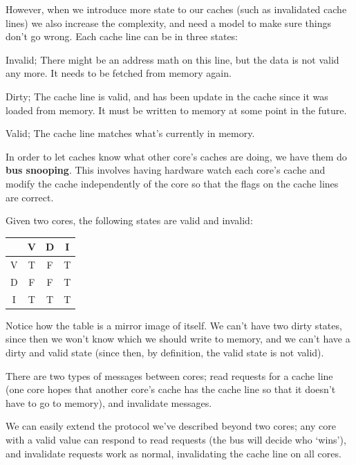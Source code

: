 However, when we introduce more state to our caches (such as invalidated cache
lines) we also increase the complexity, and need a model to make sure things
don't go wrong. Each cache line can be in three states:

\begin{description}
  \item Invalid; There might be an address math on this line, but the data is 
  not valid any more. It needs to be fetched from memory again.
  \item Dirty; The cache line is valid, and has been update in the cache since 
  it was loaded from memory. It must be written to memory at some point in the 
  future.
  \item Valid; The cache line matches what's currently in memory.
\end{description}

In order to let caches know what other core's caches are doing, we have them do
\textbf{bus snooping}. This involves having hardware watch each core's cache and
modify the cache independently of the core so that the flags on the cache lines
are correct.

Given two cores, the following states are valid and invalid:

\begin{center}
  \begin{tabular}{c|c c c}
      & V & D & I\\ \hline
    V & T & F & T\\
    D & F & F & T\\
    I & T & T & T
  \end{tabular}
\end{center}

Notice how the table is a mirror image of itself. We can't have two dirty
states, since then we won't know which we should write to memory, and we can't
have a dirty and valid state (since then, by definition, the valid state is not
valid).



There are two types of messages between cores; read requests for a cache line
(one core hopes that another core's cache has the cache line so that it doesn't
have to go to memory), and invalidate messages.

We can easily extend the protocol we've described beyond two cores; any core
with a valid value can respond to read requests (the bus will decide who
`wins'), and invalidate requests work as normal, invalidating the cache line on
all cores.

